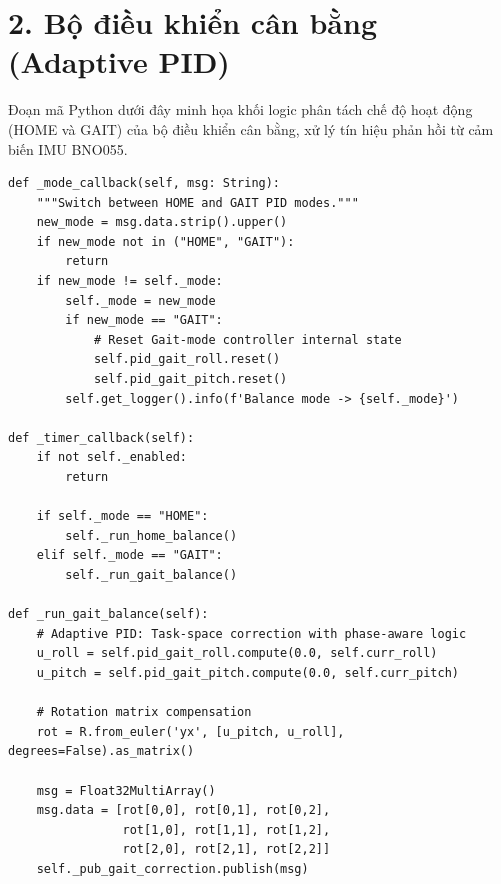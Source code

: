 \vspace{0.5cm}

\section*{2. Bộ điều khiển cân bằng (Adaptive PID)}

Đoạn mã Python dưới đây minh họa khối logic phân tách chế độ hoạt động (HOME và GAIT) của bộ điều khiển cân bằng, xử lý tín hiệu phản hồi từ cảm biến IMU BNO055.

\begin{verbatim}
def _mode_callback(self, msg: String):
    """Switch between HOME and GAIT PID modes."""
    new_mode = msg.data.strip().upper()
    if new_mode not in ("HOME", "GAIT"):
        return
    if new_mode != self._mode:
        self._mode = new_mode
        if new_mode == "GAIT":
            # Reset Gait-mode controller internal state
            self.pid_gait_roll.reset()
            self.pid_gait_pitch.reset()
        self.get_logger().info(f'Balance mode -> {self._mode}')

def _timer_callback(self):
    if not self._enabled:
        return

    if self._mode == "HOME":
        self._run_home_balance()
    elif self._mode == "GAIT":
        self._run_gait_balance()

def _run_gait_balance(self):
    # Adaptive PID: Task-space correction with phase-aware logic
    u_roll = self.pid_gait_roll.compute(0.0, self.curr_roll)
    u_pitch = self.pid_gait_pitch.compute(0.0, self.curr_pitch)
    
    # Rotation matrix compensation
    rot = R.from_euler('yx', [u_pitch, u_roll], degrees=False).as_matrix()
    
    msg = Float32MultiArray()
    msg.data = [rot[0,0], rot[0,1], rot[0,2],
                rot[1,0], rot[1,1], rot[1,2],
                rot[2,0], rot[2,1], rot[2,2]]
    self._pub_gait_correction.publish(msg)
\end{verbatim}
